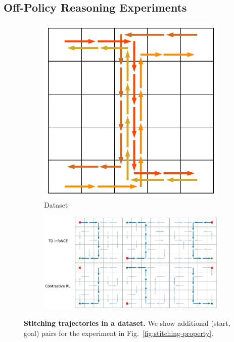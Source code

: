 \documentclass{article} %
\begin{document}
\subsection{Off-Policy Reasoning Experiments}
\label{appendix:off-policy}

\begin{figure}
    \centering
    \begin{subfigure}[c]{0.24\textwidth}
    \centering
        \includegraphics[width=\linewidth]{figures/policy_analysis/stitching_dataset.pdf}
        Dataset
    \end{subfigure}
    \hfill
    \begin{subfigure}[c]{0.75\textwidth}
        \includegraphics[width=\linewidth]{figures/policy_analysis/stitching.pdf}
    \end{subfigure}
    \caption{\textbf{Stitching trajectories in a dataset.} We show additional (start, goal) pairs for the experiment in Fig.~\ref{fig:stitching-property}.
    }
    \label{fig:stitching-property-more}
\end{figure}
\end{document}
